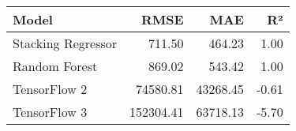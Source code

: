 \begin{tabular}{lrrr}
\toprule
Model & RMSE & MAE & R² \\
\midrule
Stacking Regressor & 711.50 & 464.23 & 1.00 \\
Random Forest & 869.02 & 543.42 & 1.00 \\
TensorFlow 2 & 74580.81 & 43268.45 & -0.61 \\
TensorFlow 3 & 152304.41 & 63718.13 & -5.70 \\
\bottomrule
\end{tabular}
